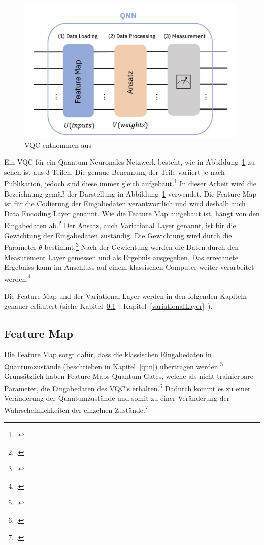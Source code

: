 \begin{figure}[htb]
    \centering
    \includegraphics[width=11cm]{lib/graphics/vqc.png}
    \caption[Variational Quantum Circuit]{\ac{VQC} entnommen aus~\cite{Qiskitb}}
    \label{abb:vqc1}
\end{figure}


Ein \ac{VQC} für ein Quantum Neuronales Netzwerk besteht, wie in Abbildung~\ref{abb:vqc1} zu sehen ist aus 3 Teilen.
Die genaue Benennung der Teile variiert je nach Publikation, jedoch sind diese immer gleich aufgebaut.\footcite[Vgl.][]{McClean2018, Hu2022, Chen2022, Yu2023, Cao2023}
In dieser Arbeit wird die Bezeichnung gemäß der Darstellung in Abbildung~\ref{abb:vqc1} verwendet.
Die Feature Map ist für die Codierung der Eingabedaten verantwortlich und wird deshalb auch Data Encoding Layer genannt. Wie die Feature Map aufgebaut ist, hängt von den Eingabedaten ab.\footcite[Vgl.][S. 2]{Cao2023}
Der Ansatz, auch Variational Layer genannt, ist für die Gewichtung der Eingabedaten zuständig. Die Gewichtung wird durch die Parameter $\theta$ bestimmt.\footcite[Vgl.][S. 4]{Yu2023}
Nach der Gewichtung werden die Daten durch den Measurement Layer gemessen und als Ergebnis ausgegeben.
Das errechnete Ergebniss kann im Anschluss auf einem klassischen Computer weiter verarbeitet werden.\footcite[Vgl.][S. 9]{Chen2022}

Die Feature Map und der Variational Layer werden in den folgenden Kapiteln genauer erläutert
(siehe Kapitel~\ref{dataEncoding}~; Kapitel~\ref{variationalLayer}~).


\subsection{Feature Map}\label{dataEncoding}

Die Feature Map sorgt dafür, dass die klassischen Eingabedaten in Quantumzustände (beschrieben in Kapitel~\ref{qnn}) übertragen werden.\footcite[Vgl.][S. 3f.]{Yu2023}
Grunsätzlich haben Feature Maps Quantum Gates, welche als nicht trainierbare Parameter, die Eingabedaten des \ac{VQC}'s erhalten.\footcite[Vgl.][S. 2]{Hu2022}
Dadurch kommt es zu einer Veränderung der Quantumzustände und somit zu einer Veränderung der Wahrscheinlichkeiten der einzelnen Zustände.\footcite[Vgl.][S. 96]{Weigold2021}

